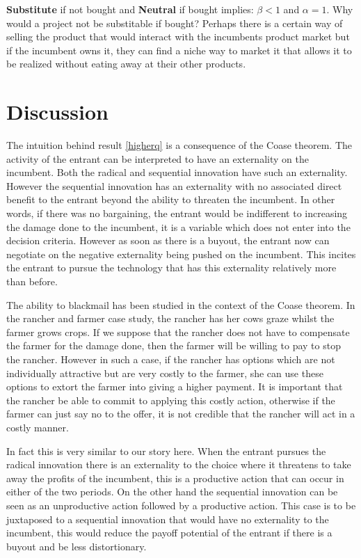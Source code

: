 \textbf{Substitute} if not bought and \textbf{Neutral} if bought implies: $\beta<1$ and $\alpha=1$. Why would a project not be substitable if bought? Perhaps there is a certain way of selling the product that would interact with the incumbents product market but if the incumbent owns it, they can find a niche way to market it that allows it to be realized without eating away at their other products.
\section{Discussion}\label{discussion}

The intuition behind result \ref{higherq} is a consequence of the Coase theorem. The activity of the entrant can be interpreted to have an externality on the incumbent. Both the radical and sequential innovation have such an externality. However the sequential innovation has an externality with no associated direct benefit to the entrant beyond the ability to threaten the incumbent. In other words, if there was no bargaining, the entrant would be indifferent to increasing the damage done to the incumbent, it is a variable which does not enter into the decision criteria. However as soon as there is a buyout, the entrant now can negotiate on the negative externality being pushed on the incumbent. This incites the entrant to pursue the technology that has this externality relatively more than before. 

The ability to blackmail has been studied in the context of the Coase theorem\citep{Dem}. In the rancher and farmer case study, the rancher has her cows graze whilst the farmer grows crops. If we suppose that the rancher does not have to compensate the farmer for the damage done, then the farmer will be willing to pay to stop the rancher. However in such a case, if the rancher has options which are not individually attractive but are very costly to the farmer, she can use these options to extort the farmer into giving a higher payment. It is important that the rancher be able to commit to applying this costly action, otherwise if the farmer can just say no to the offer, it is not credible that the rancher will act in a costly manner. 

In fact this is very similar to our story here. When the entrant pursues the radical innovation there is an externality to the choice where it threatens to take away the profits of the incumbent, this is a productive action that can occur in either of the two periods. On the other hand the sequential innovation can be seen as an unproductive action followed by a productive action. This case is to be juxtaposed to a sequential innovation that would have no externality to the incumbent, this would reduce the payoff potential of the entrant if there is a buyout and be less distortionary. 

